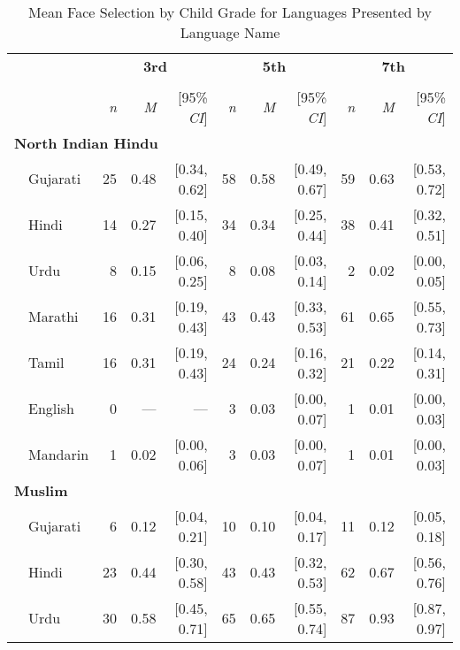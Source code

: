 \begin{table}[t]
\centering
\caption{Mean Face Selection by Child Grade for Languages Presented by Language Name}\\
\begin{footnotesize}
\label{tab:face-label-means}
\begin{tabular}{p{.1in}lrrrrrrrrr}
\toprule
 &  & \multicolumn{3}{c}{\textbf{3rd}} & \multicolumn{3}{c}{\textbf{5th}} & \multicolumn{3}{c}{\textbf{7th}} \\
\cline{3-5} \cline{6-8} \cline{9-11}\\[-.75em]
&  & \textit{n} & \textit{M} & [95\% \textit{CI}] &  \textit{n} & \textit{M} & [95\% \textit{CI}] &  \textit{n}  & \textit{M} & [95\% \textit{CI}]\\
\midrule
\multicolumn{11}{l}{\textbf{North Indian Hindu}}\\
& Gujarati & 25 & 0.48 & [0.34, 0.62] & 58 & 0.58 & [0.49, 0.67] & 59 & 0.63 & [0.53, 0.72]\\

 & Hindi & 14 & 0.27 & [0.15, 0.40] & 34 & 0.34 & [0.25, 0.44] & 38 & 0.41 & [0.32, 0.51]\\

 & Urdu & 8 & 0.15 & [0.06, 0.25] & 8 & 0.08 & [0.03, 0.14] & 2 & 0.02 & [0.00, 0.05]\\

 & Marathi & 16 & 0.31 & [0.19, 0.43] & 43 & 0.43 & [0.33, 0.53] & 61 & 0.65 & [0.55, 0.73]\\

 & Tamil & 16 & 0.31 & [0.19, 0.43] & 24 & 0.24 & [0.16, 0.32] & 21 & 0.22 & [0.14, 0.31]\\

 & English & 0 & --- & --- & 3 & 0.03 & [0.00, 0.07] & 1 & 0.01 & [0.00, 0.03]\\

& Mandarin & 1 & 0.02 & [0.00, 0.06] & 3 & 0.03 & [0.00, 0.07] & 1 & 0.01 & [0.00, 0.03]\\

\midrule
\multicolumn{11}{l}{\textbf{Muslim}}\\
& Gujarati & 6 & 0.12 & [0.04, 0.21] & 10 & 0.10 & [0.04, 0.17] & 11 & 0.12 & [0.05, 0.18]\\

 & Hindi & 23 & 0.44 & [0.30, 0.58] & 43 & 0.43 & [0.32, 0.53] & 62 & 0.67 & [0.56, 0.76]\\

 & Urdu & 30 & 0.58 & [0.45, 0.71] & 65 & 0.65 & [0.55, 0.74] & 87 & 0.93 & [0.87, 0.97]\\


\end{tabular}
\end{footnotesize}
\end{table}
